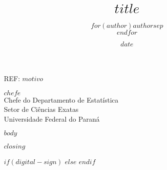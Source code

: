 \documentclass[a4paper, 11pt]{letter}
\title{$title$}
\title{}
\author{$for(author)$$author$$sep$ \\ $endfor$}
\author{}
\date{$date$}
\date{}
\begin{document}

%

\begin{letter} {REF: $motivo$}

  \opening{$chefe$ \\
    Chefe do Departamento de Estatística \\
    Setor de Ciências Exatas \\
    Universidade Federal do Paraná }


  \hspace{3cm}

  $body$

  \vspace{0.3cm}
  \hspace{1cm}
  $closing$
  \vspace{0.3cm}

  \begin{minipage}{1\linewidth}
    $if(digital-sign)$
    $else$
    \vspace{2cm}
    $endif$
  \end{minipage}
  \vfill
  \vspace{-1.5cm}

\end{letter}
\end{document}
